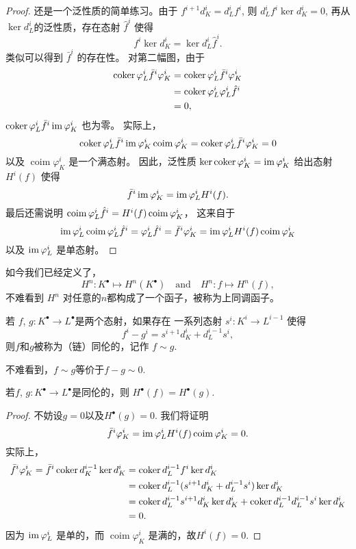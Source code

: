 \begin{proof}
	还是一个泛性质的简单练习。由于
	$f^{i+1}d_K^i=d_L^if^i$, 则 $d_L^if^i\ker d_K^i=0$, 再从 
    $\ker d_L^i$的泛性质，存在态射 $\hat{f}^i$ 使得
	\[
		f^i\ker d_K^i=\ker d_L^i\hat{f}^i.
	\]
	类似可以得到 $\bar f^i$ 的存在性。 对第二幅图，由于
	\[
	\begin{aligned}
		\operatorname{coker} \varphi^i_L \bar f^i \varphi^i_K
		&= \operatorname{coker} \varphi^i_L \bar f^i \varphi^i_K\\
		&= \operatorname{coker} \varphi^i_L \varphi^i_L \hat f^i \\
		&= 0,
	\end{aligned}
	\]
	$\operatorname{coker} \varphi^i_L \bar f^i \operatorname{im} \varphi^i_K$ 也为零。
    实际上，
	\[
		\operatorname{coker} \varphi^i_L \bar f^i \operatorname{im} \varphi^i_K\operatorname{coim}\varphi^i_K=\operatorname{coker} \varphi^i_L \bar f^i \varphi^i_K=0
	\]
	以及 $\operatorname{coim}\varphi^i_K$ 是一个满态射。
    因此，泛性质
	$\ker \operatorname{coker} \varphi_K^i=\operatorname{im} \varphi_K^i$ 给出态射 $H^i(f)$ 使得
	\[
		\bar f^i \operatorname{im} \varphi^i_K=\operatorname{im} \varphi_L^i H^i(f).
	\]
	最后还需说明 $\operatorname{coim} \varphi_L^i\hat f^i= H^i(f)\operatorname{coim} \varphi_K^i$，
    这来自于
	\[
		\operatorname{im} \varphi_L^i\operatorname{coim} \varphi_L^i\hat f^i=\varphi^i_L\hat f^i=\bar f^i \varphi^i_K=
		\operatorname{im} \varphi_L^i H^i(f)\operatorname{coim} \varphi^i_K
	\]
	以及 $\operatorname{im} \varphi_L^i$ 是单态射。
\end{proof}

如今我们已经定义了，
\[
	H^n :K^\bullet\mapsto H^n(K^\bullet)\quad \text{and}\quad
	H^n :f\mapsto H^n(f),
\]
不难看到 $H^n$ 对任意的$n$都构成了一个函子，被称为上同调函子。

\begin{para}[链同伦]
	若 $f$, $g:K^\bullet\to L^\bullet$是两个态射，如果存在
	一系列态射 $s^i:K^i\to L^{i-1}$ 使得
	\[
		f^i-g^i=s^{i+1}d_K^i+d_L^{i-1}s^i,
	\]
	则$f$和$g$被称为（链）同伦的，记作 $f\sim g$.
\end{para}

不难看到，$f\sim g$等价于$f-g\sim 0$.

\begin{lem}\label{lem:1.7}
	若$f$, $g:K^\bullet\to L^\bullet$是同伦的，则
	$H^\bullet(f)=H^\bullet(g)$.
\end{lem}

\begin{proof}
	不妨设$g=0$以及$H^\bullet(g)=0$. 我们将证明
	\[
		\bar f^i \varphi_K^i = \operatorname{im} \varphi_L^i H^i(f) \operatorname{coim} \varphi_K^i=0.
	\]
	实际上，
	\[
		\begin{aligned}
		\bar f^i \varphi_K^i=\bar f^i \operatorname{coker} d_K^{i-1}\ker d_{K}^i 
		&=\operatorname{coker} d_L^{i-1} f^i\ker d_{K}^i\\
		&=\operatorname{coker} d_L^{i-1}(s^{i+1}d_K^i+d_L^{i-1}s^i)\ker d_{K}^i\\
		&=\operatorname{coker} d_L^{i-1}s^{i+1}d_K^i\ker d_{K}^i+\operatorname{coker} d_L^{i-1}d_L^{i-1}s^i\ker d_{K}^i\\
		&=0.
		\end{aligned}
	\]
	因为 $\operatorname{im} \varphi_L^i$ 是单的，而
	$\operatorname{coim} \varphi_K^i$ 是满的，故$H^i(f) = 0$.
\end{proof}

